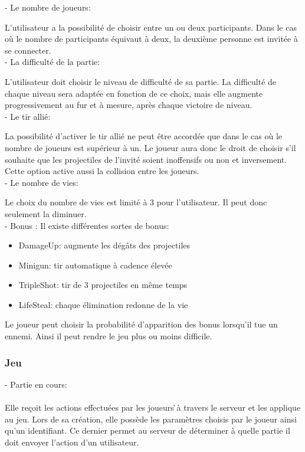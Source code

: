 \documentclass[a4paper,12pt]{article}
\begin{document}
- Le nombre de joueurs: 

L'utilisateur a la possibilité de choisir entre un ou deux participants. Dans le cas où le nombre de participants équivaut à deux, la deuxième personne est invitée à se connecter.\\

- La difficulté de la partie:

 L'utilisateur doit choisir le niveau de difficulté  de sa partie. La difficulté de chaque niveau sera adaptée en fonction de ce choix, mais elle augmente progressivement au fur et à mesure, après chaque victoire de niveau. \\

- Le tir allié: 

La possibilité d'activer le tir allié ne peut être accordée que dans le cas où le nombre de joueurs est supérieur à un.
Le joueur aura donc le droit de choisir s'il souhaite que les projectiles de l'invité soient inoffensifs ou non et inversement. Cette option active aussi la collision entre les joueurs. \\

- Le nombre de vies: 

Le choix du nombre de vies est limité à 3 pour l'utilisateur.  Il peut donc seulement la diminuer.\\

- Bonus :
Il existe différentes sortes de bonus:
\begin{itemize}
  \item DamageUp: augmente les dégâts des projectiles
  \item Minigun: tir automatique à cadence élevée
  \item TripleShot: tir de 3 projectiles en même temps
  \item LifeSteal: chaque élimination redonne de la vie
\end{itemize}

Le joueur peut choisir la probabilité d'apparition des bonus lorsqu'il tue un ennemi. 
Ainsi il peut rendre le jeu plus ou moins difficile. 

\subsubsection{Jeu}

- Partie en cours:\\ \\
Elle reçoit les actions effectuées par les joueurs ̀à travers le serveur et les applique au jeu. 
Lors de sa création, elle possède les paramètres choisis par le joueur ainsi qu’un identifiant. 
Ce dernier permet au serveur de déterminer à quelle partie il doit envoyer l’action d’un 
utilisateur.\\
\end{document}
